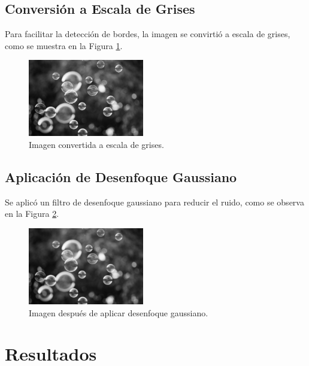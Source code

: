\documentclass[conference]{IEEEtran}
\begin{document}
\FloatBarrier



\subsection{Conversión a Escala de Grises}
Para facilitar la detección de bordes, la imagen se convirtió a escala de grises, como se muestra en la Figura \ref{fig:grises}.


\FloatBarrier

\begin{figure}[h]
    \centering
    \includegraphics[width=0.45\textwidth]{imagen_grises.jpg}
    \caption{Imagen convertida a escala de grises.}
    \label{fig:grises}
\end{figure}

\FloatBarrier


\subsection{Aplicación de Desenfoque Gaussiano}
Se aplicó un filtro de desenfoque gaussiano para reducir el ruido, como se observa en la Figura \ref{fig:gauss}.

\FloatBarrier

\begin{figure}[h]
    \centering
    \includegraphics[width=0.45\textwidth]{imagen_gauss.jpg}
    \caption{Imagen después de aplicar desenfoque gaussiano.}
    \label{fig:gauss}
\end{figure}

\FloatBarrier


\section{Resultados}
\end{document}
